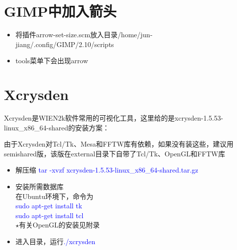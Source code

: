 \documentclass{article}      %
\begin{document}


\section{\rm{GIMP}中加入箭头}
\begin{itemize}
	\item 将插件\textrm{arrow-set-size.scm}放入目录\textrm{/home/jun-jiang/.config/GIMP/2.10/scripts}
	\item \textrm{tools}菜单下会出现\textrm{arrow}
\end{itemize}

\section{Xcrysden}
\textrm{Xcrysden}是\textrm{WIEN2k}软件常用的可视化工具，这里给的是\textrm{xcrysden-1.5.53-linux\_x86\_64-shared}的安装方案：

由于\textrm{Xcrysden}对\textrm{Tcl/Tk}、\textrm{Mesa}和\textrm{FFTW}库有依赖，如果没有装这些，建议用\textrm{semishared}版，该版在\textrm{external}目录下自带了\textrm{Tcl/Tk}、\textrm{OpenGL}和\textrm{FFTW}库
\begin{itemize}
	\item 解压缩 \textcolor{blue}{tar\; -xvzf\; xcrysden-1.5.53-linux\_x86\_64-shared.tar.gz}
	\item 安装所需数据库\\
		在\textrm{Ubuntu}环境下，命令为\\
		\textcolor{blue}{sudo\; apt-get\; install tk}\\
		\textcolor{blue}{sudo\; apt-get\; install tcl}\\
		$\star$有关\textrm{OpenGL}的安装见附录 
	\item 进入目录，运行\textcolor{blue}{./xcrysden}
\end{itemize}
\end{document}
